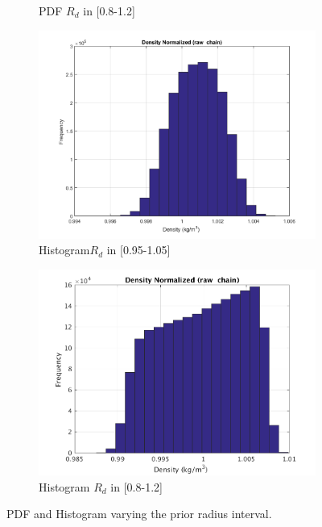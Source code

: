 \documentclass{article}
\begin{document}
\begin{figure}[H]
\begin{center}
\begin{subfigure}{0.4\textwidth}
    \caption{\centering PDF  $R_d$ in [0.8-1.2]}
  \end{subfigure}
  \begin{subfigure}{0.4\textwidth}
    \centering\includegraphics[width=1.1\textwidth,keepaspectratio]{images/inverse_problem/infer_radius/drag_125/range_short/density_histogram_raw.png}
    \caption{\centering Histogram$R_d$ in [0.95-1.05]}
  \end{subfigure}
  \begin{subfigure}{0.4\textwidth}
    \centering\includegraphics[width=1.1\textwidth,keepaspectratio]{images/inverse_problem/infer_radius/drag_125/range_long/density_histogram_raw.png}
    \caption{\centering Histogram $R_d$ in [0.8-1.2]}
  \end{subfigure}

\caption{PDF and Histogram varying the prior radius interval.}
\label{fig:results_interval} 
 \end{center}
\end{figure}
\end{document}
